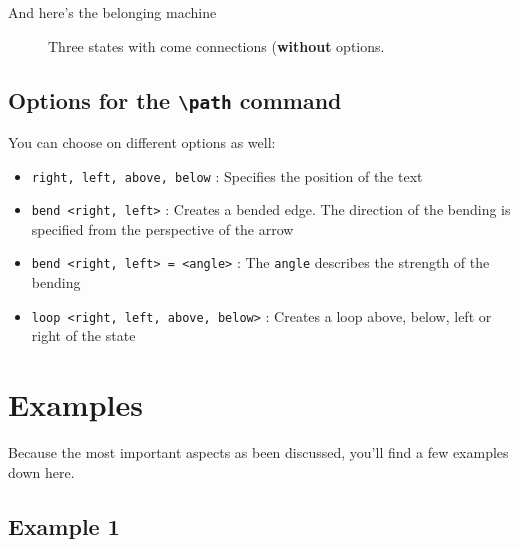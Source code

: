 \documentclass[../../../include/open-logic-chapter]{subfiles}
\begin{document}
		And here's the belonging machine\\
		\begin{figure}[ht]
			\centering
			\caption{Three states with come connections (\textbf{without} options.}
		\end{figure}
	\subsection{Options for the \texttt{\textbackslash path} command}
		You can choose on different options as well:
		\begin{itemize}
			\item \texttt{right, left, above, below} : Specifies the position of the text
			\item \texttt{bend <right, left>} : Creates a bended edge. The direction of the bending is specified from the perspective of the arrow
			\item \texttt{bend <right, left> = <angle>} : The \texttt{angle} describes the strength of the bending
			\item \texttt{loop <right, left, above, below>} : Creates a loop above, below, left or right of the state
		\end{itemize}
	\section{Examples}
		Because the most important aspects as been discussed, you'll find a few examples down here.
	\subsection{Example 1}
\end{document}

